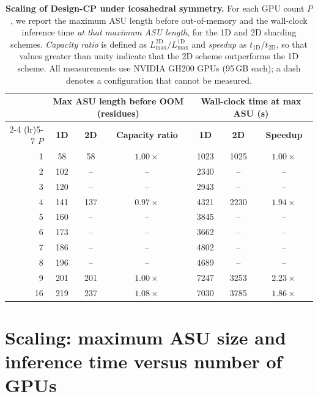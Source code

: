 \begin{table}[!t]
  \centering
  \small
  \caption{\textbf{Scaling of Design-CP under icosahedral symmetry.} For each GPU count $P$,
   we report the maximum ASU length before out-of-memory and the wall-clock inference time 
   \emph{at that maximum ASU length}, for the 1D and 2D sharding schemes. 
   \emph{Capacity ratio} is defined as $L_{\max}^{\mathrm{2D}}/L_{\max}^{\mathrm{1D}}$ 
   and \emph{speedup} as $t_{\mathrm{1D}}/t_{\mathrm{2D}}$, so that values greater than 
   unity indicate that the 2D scheme outperforms the 1D scheme. All measurements use NVIDIA GH200
   GPUs (95\,GB each); a dash denotes a configuration that cannot be measured.}
  \label{tab:scaling}
  \begin{tabular}{rcccccc}
    \toprule
    & \multicolumn{3}{c}{\textbf{Max ASU length before OOM} (residues)} & \multicolumn{3}{c}{\textbf{Wall-clock time at max ASU} (s)} \\
    \cmidrule(lr){2-4} \cmidrule(lr){5-7}
    $P$ & \textbf{1D} & \textbf{2D} & \textbf{Capacity ratio} & \textbf{1D} & \textbf{2D} & \textbf{Speedup} \\
    \midrule
    1  & 58  & 58  & $1.00\times$ & 1023 & 1025 & $1.00\times$ \\
    2  & 102 & --  & --           & 2340 & --   & --           \\
    3  & 120 & --  & --           & 2943 & --   & --           \\
    4  & 141 & 137 & $0.97\times$ & 4321 & 2230 & $1.94\times$ \\
    5  & 160 & --  & --           & 3845 & --   & --           \\
    6  & 173 & --  & --           & 3662 & --   & --           \\
    7  & 186 & --  & --           & 4802 & --   & --           \\
    8  & 196 & --  & --           & 4689 & --   & --           \\
    9  & 201 & 201 & $1.00\times$ & 7247 & 3253 & $2.23\times$ \\
    16 & 219 & 237 & $1.08\times$ & 7030 & 3785 & $1.86\times$ \\
    \bottomrule
  \end{tabular}
\end{table}

\section{Scaling: maximum ASU size and inference time versus number of GPUs}
\label{sec:results-scaling}

